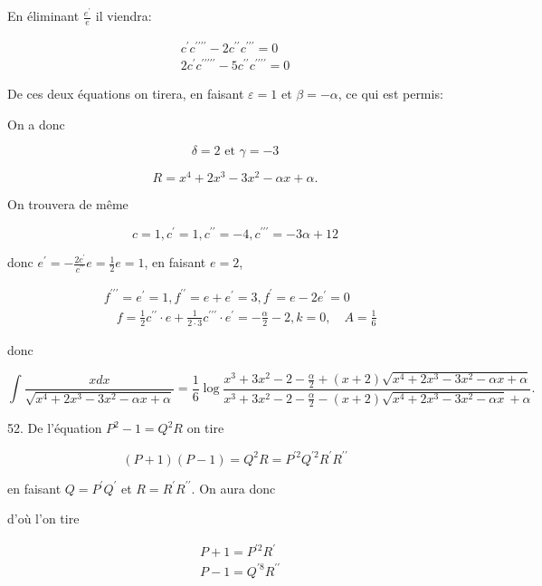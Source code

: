 \documentclass{article}
\begin{document}
En éliminant \(\frac{e^{\prime}}{e}\) il viendra:

\[
\begin{gathered}
c^{\prime} c^{\prime \prime \prime \prime}-2 c^{\prime \prime} c^{\prime \prime \prime}=0 \\
2 c^{\prime} c^{\prime \prime \prime \prime \prime}-5 c^{\prime \prime} c^{\prime \prime \prime \prime}=0
\end{gathered}
\]

De ces deux équations on tirera, en faisant \(\varepsilon=1\) et \(\beta=-\alpha\), ce qui est permis:

On a donc

\[
\delta=2 \text { et } \gamma=-3
\]

\[
R=x^{4}+2 x^{3}-3 x^{2}-\alpha x+\alpha .
\]

On trouvera de même

\[
c=1, c^{\prime}=1, c^{\prime \prime}=-4, c^{\prime \prime \prime}=-3 \alpha+12
\]

donc \(e^{\prime}=-\frac{2 c^{\prime}}{c^{\prime \prime}} e=\frac{1}{2} e=1\), en faisant \(e=2\),

\[
\begin{aligned}
& f^{\prime \prime \prime}=e^{\prime}=1, f^{\prime \prime}=e+e^{\prime}=3, f^{\prime}=e-2 e^{\prime}=0 \\
& \quad f=\frac{1}{2} c^{\prime \prime} \cdot e+\frac{1}{2 \cdot 3} c^{\prime \prime \prime} \cdot e^{\prime}=-\frac{\alpha}{2}-2, k=0, \quad A=\frac{1}{6}
\end{aligned}
\]

donc

\[
\int \frac{x d x}{\sqrt{x^{4}+2 x^{3}-3 x^{2}-\alpha x+\alpha}}=\frac{1}{6} \log \frac{x^{3}+3 x^{2}-2-\frac{\alpha}{2}+(x+2) \sqrt{x^{4}+2 x^{3}-3 x^{2}-\alpha x+\alpha}}{x^{3}+3 x^{2}-2-\frac{\alpha}{2}-(x+2) \sqrt{x^{4}+2 x^{3}-3 x^{2}-\alpha x}+\alpha} .
\]

52. De l'équation \(P^{2}-1=Q^{2} R\) on tire

\[
(P+1)(P-1)=Q^{2} R=P^{\prime 2} Q^{\prime 2} R^{\prime} R^{\prime \prime}
\]

en faisant \(Q=P^{\prime} Q^{\prime}\) et \(R=R^{\prime} R^{\prime \prime}\). On aura donc

d'où l'on tire

\[
\begin{aligned}
& P+1=P^{\prime 2} R^{\prime} \\
& P-1=Q^{\prime 8} R^{\prime \prime}
\end{aligned}
\]
\end{document}
